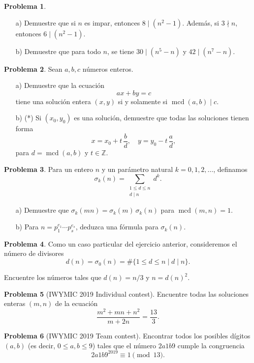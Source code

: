 \documentclass{article}
\newcommand{\ZZ}{\mathbb{Z}}
\DeclareMathOperator{\mcd}{mcd}
\theoremstyle{definition}
\newtheorem{problema}{Problema}
\begin{document}
\begin{problema}
  ~

  \begin{enumerate}
  \item[a)] Demuestre que si $n$ es impar, entonces $8 \mid (n^2 - 1)$. Además,
    si $3\nmid n$, entonces $6 \mid (n^2 - 1)$.

  \item[b)] Demuestre que para todo $n$, se tiene $30 \mid (n^5 - n)$ y
    $42 \mid (n^7 - n)$.
  \end{enumerate}
\end{problema}

\begin{problema}
  Sean $a,b,c$ números enteros.

  \begin{enumerate}
  \item[a)] Demuestre que la ecuación
    $$ax + by = c$$
    tiene una solución entera $(x,y)$ si y solamente si $\mcd (a,b) \mid c$.

  \item[b)] (*) Si $(x_0,y_0)$ es una solución, demuestre que todas las
    soluciones tienen forma
    $$x = x_0 + t\,\frac{b}{d}, \quad y = y_0 - t\,\frac{a}{d},$$
    para $d = \mcd (a,b)$ y $t \in \ZZ$.
  \end{enumerate}
\end{problema}

\begin{problema}
  Para un entero $n$ y un parámetro natural $k = 0,1,2,\ldots$, definamos
  $$\sigma_k (n) = \sum_{\substack{1 \le d \le n \\ d \mid n}} d^k.$$

  \begin{enumerate}
  \item[a)] Demuestre que $\sigma_k (mn) = \sigma_k (m) \, \sigma_k (n)$ para
    $\mcd (m,n) = 1$.

  \item[b)] Para $n = p_1^{e_1} \cdots p_s^{e_s}$, deduzca una fórmula para
    $\sigma_k (n)$.
  \end{enumerate}
\end{problema}

\begin{problema}
  Como un caso particular del ejercicio anterior, consideremos el número de
  divisores
  $$d (n) = \sigma_0 (n) = \# \{ 1 \le d \le n \mid d \mid n \}.$$

  Encuentre los números tales que $d (n) = n/3$ y $n = d(n)^2$.
\end{problema}

\begin{problema}[IWYMIC 2019 Individual contest]
  Encuentre todas las soluciones enteras $(m,n)$ de la ecuación
  $$\frac{m^2 + mn + n^2}{m + 2n} = \frac{13}{3}.$$
\end{problema}

\begin{problema}[IWYMIC 2019 Team contest]
  Encontrar todos los posibles dígitos $(a,b)$ (es decir, $0 \le a, b \le 9$)
  tales que el número $2a1b9$ cumple la congruencia
  $$2a1b9^{2019} \equiv 1 \pmod{13}.$$
\end{problema}
\end{document}
